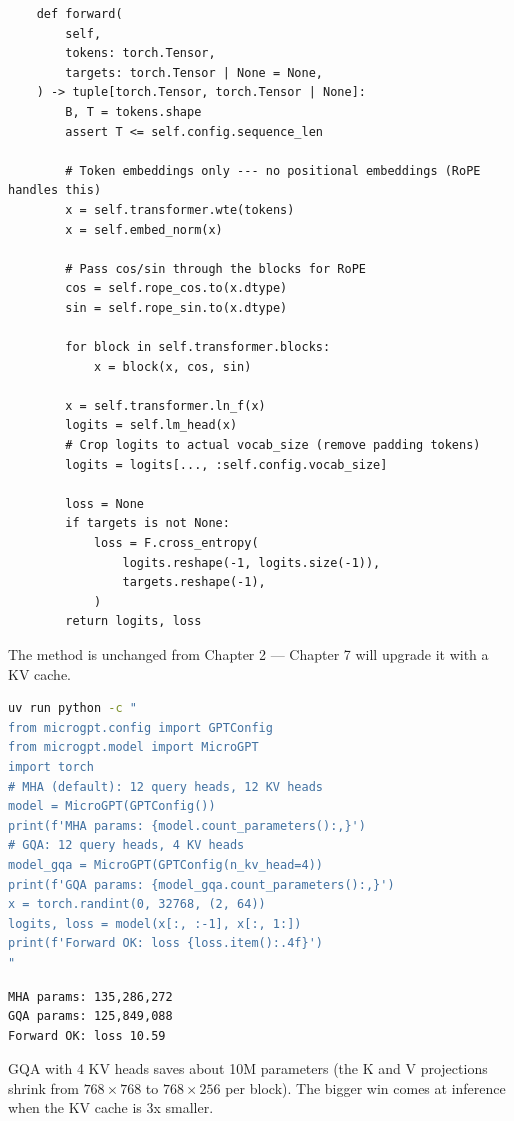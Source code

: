 \begin{lstlisting}
    def forward(
        self,
        tokens: torch.Tensor,
        targets: torch.Tensor | None = None,
    ) -> tuple[torch.Tensor, torch.Tensor | None]:
        B, T = tokens.shape
        assert T <= self.config.sequence_len

        # Token embeddings only --- no positional embeddings (RoPE handles this)
        x = self.transformer.wte(tokens)
        x = self.embed_norm(x)

        # Pass cos/sin through the blocks for RoPE
        cos = self.rope_cos.to(x.dtype)
        sin = self.rope_sin.to(x.dtype)

        for block in self.transformer.blocks:
            x = block(x, cos, sin)

        x = self.transformer.ln_f(x)
        logits = self.lm_head(x)
        # Crop logits to actual vocab_size (remove padding tokens)
        logits = logits[..., :self.config.vocab_size]

        loss = None
        if targets is not None:
            loss = F.cross_entropy(
                logits.reshape(-1, logits.size(-1)),
                targets.reshape(-1),
            )
        return logits, loss
\end{lstlisting}

The  method is unchanged from Chapter 2 --- Chapter 7 will upgrade it with a KV cache.


\shelltag
\begin{lstlisting}[language=bash]
uv run python -c "
from microgpt.config import GPTConfig
from microgpt.model import MicroGPT
import torch
# MHA (default): 12 query heads, 12 KV heads
model = MicroGPT(GPTConfig())
print(f'MHA params: {model.count_parameters():,}')
# GQA: 12 query heads, 4 KV heads
model_gqa = MicroGPT(GPTConfig(n_kv_head=4))
print(f'GQA params: {model_gqa.count_parameters():,}')
x = torch.randint(0, 32768, (2, 64))
logits, loss = model(x[:, :-1], x[:, 1:])
print(f'Forward OK: loss {loss.item():.4f}')
"
\end{lstlisting}

\outputtag
\begin{lstlisting}[language={}]
MHA params: 135,286,272
GQA params: 125,849,088
Forward OK: loss 10.59
\end{lstlisting}

GQA with 4 KV heads saves about 10M parameters (the K and V projections shrink from $768 \times 768$ to $768 \times 256$ per block).  The bigger win comes at inference when the KV cache is 3x smaller.

